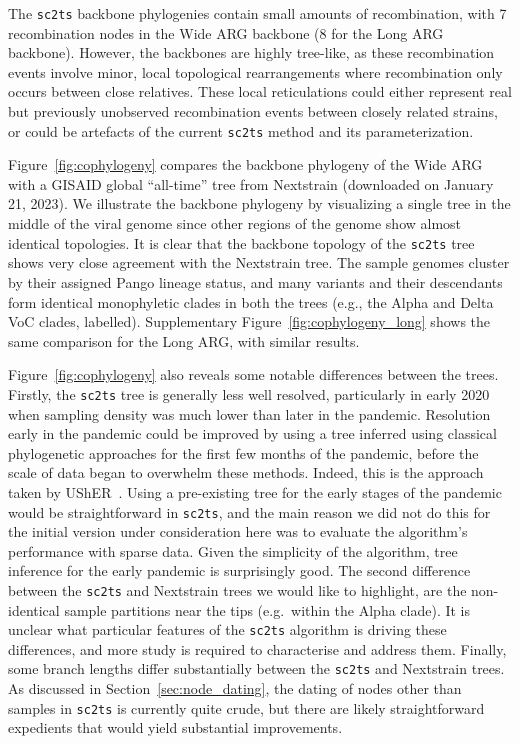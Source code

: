 \documentclass{article}
\begin{document}
The \texttt{sc2ts} backbone phylogenies contain small amounts of recombination,
with 7 recombination nodes in the Wide ARG backbone (8 for the Long ARG
backbone). However, the backbones are highly tree-like, as these
recombination events involve minor, local topological rearrangements
where recombination only occurs between close relatives.
These local reticulations could either represent
real but previously unobserved recombination events between closely related strains,
or could be artefacts of the current \texttt{sc2ts} method and its parameterization.

Figure~\ref{fig:cophylogeny} compares the backbone phylogeny of the Wide ARG with
a GISAID global ``all-time'' tree from Nextstrain
(downloaded on January 21, 2023).
We illustrate the backbone phylogeny by visualizing
a single tree in the middle of the viral genome
since other regions of the
genome show almost identical topologies.
It is clear that the backbone topology of the \texttt{sc2ts} tree shows very close
agreement with the Nextstrain tree. The sample genomes cluster by their
assigned Pango lineage status, and many variants and their descendants form
identical monophyletic clades in both the trees (e.g., the Alpha and Delta VoC
clades, labelled).
Supplementary Figure~\ref{fig:cophylogeny_long} shows the same comparison for the Long ARG, with similar results.

Figure~\ref{fig:cophylogeny} also reveals some notable differences between the
trees. Firstly, the \texttt{sc2ts} tree is generally less well resolved,
particularly in early 2020 when sampling density was much lower than
later in the pandemic. Resolution early in the pandemic could be improved
by using a tree inferred using classical phylogenetic
approaches for the first few months of the pandemic, before the scale of
data began to overwhelm these methods. Indeed, this is the approach
taken by UShER~\citep{Turakhia2021-ur}. Using a pre-existing tree for
the early stages of the pandemic would be straightforward in \texttt{sc2ts},
and the main reason we did not do this for the initial
version under consideration here was to evaluate the algorithm's
performance with sparse data. Given
the simplicity of the algorithm, tree inference for the early pandemic
is surprisingly good.
The second difference between the \texttt{sc2ts} and Nextstrain trees
we would like to highlight, are the non-identical sample partitions
near the tips (e.g.\ within the Alpha clade). It is unclear what
particular features of the \texttt{sc2ts} algorithm is driving these
differences, and more study is required to characterise and address them.
Finally, some branch lengths differ substantially between the \texttt{sc2ts}
and Nextstrain trees.
As discussed in Section~\ref{sec:node_dating}, the dating of nodes
other than samples in \texttt{sc2ts} is currently quite crude,
but there are likely straightforward expedients that would yield
substantial improvements.
\end{document}
